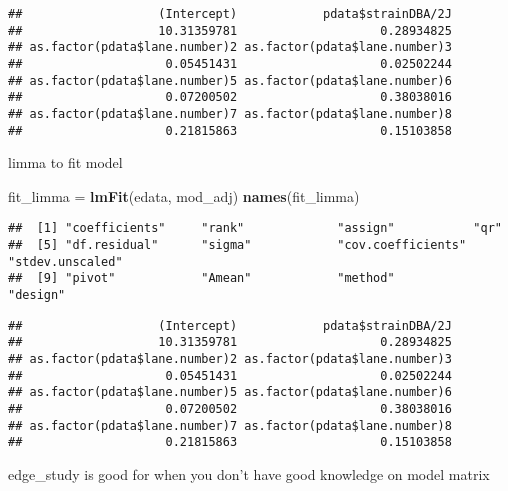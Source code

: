 \documentclass[]{article}
\newenvironment{Shaded}{\begin{snugshade}}{\end{snugshade}}
\newcommand{\KeywordTok}[1]{\textcolor[rgb]{0.13,0.29,0.53}{\textbf{#1}}}
\newcommand{\DecValTok}[1]{\textcolor[rgb]{0.00,0.00,0.81}{#1}}
\newcommand{\StringTok}[1]{\textcolor[rgb]{0.31,0.60,0.02}{#1}}
\newcommand{\OperatorTok}[1]{\textcolor[rgb]{0.81,0.36,0.00}{\textbf{#1}}}
\newcommand{\NormalTok}[1]{#1}
\begin{document}
\begin{verbatim}
##                   (Intercept)            pdata$strainDBA/2J 
##                   10.31359781                    0.28934825 
## as.factor(pdata$lane.number)2 as.factor(pdata$lane.number)3 
##                    0.05451431                    0.02502244 
## as.factor(pdata$lane.number)5 as.factor(pdata$lane.number)6 
##                    0.07200502                    0.38038016 
## as.factor(pdata$lane.number)7 as.factor(pdata$lane.number)8 
##                    0.21815863                    0.15103858
\end{verbatim}

limma to fit model

\begin{Shaded}
\begin{Highlighting}[]
\NormalTok{fit_limma =}\StringTok{ }\KeywordTok{lmFit}\NormalTok{(edata, mod_adj)}
\KeywordTok{names}\NormalTok{(fit_limma)}
\end{Highlighting}
\end{Shaded}

\begin{verbatim}
##  [1] "coefficients"     "rank"             "assign"           "qr"              
##  [5] "df.residual"      "sigma"            "cov.coefficients" "stdev.unscaled"  
##  [9] "pivot"            "Amean"            "method"           "design"
\end{verbatim}

\begin{Shaded}
\end{Shaded}

\begin{verbatim}
##                   (Intercept)            pdata$strainDBA/2J 
##                   10.31359781                    0.28934825 
## as.factor(pdata$lane.number)2 as.factor(pdata$lane.number)3 
##                    0.05451431                    0.02502244 
## as.factor(pdata$lane.number)5 as.factor(pdata$lane.number)6 
##                    0.07200502                    0.38038016 
## as.factor(pdata$lane.number)7 as.factor(pdata$lane.number)8 
##                    0.21815863                    0.15103858
\end{verbatim}

edge\_study is good for when you don't have good knowledge on model
matrix
\end{document}
